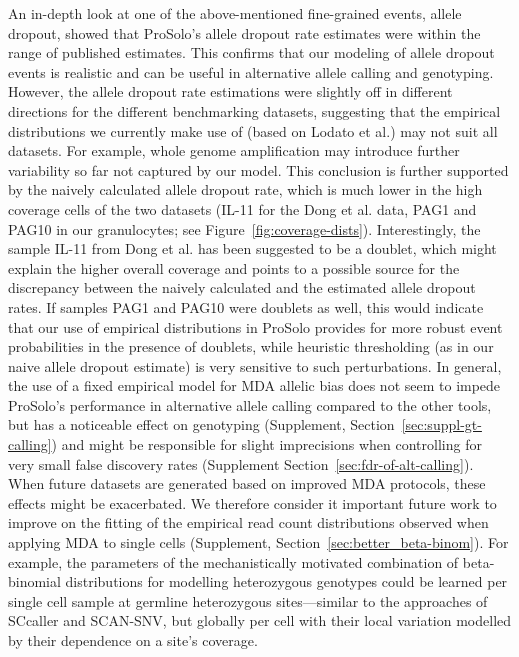 \documentclass[12pt,inline]{wlscirep}
\begin{document}
An in-depth look at one of the above-mentioned fine-grained events, allele dropout, showed that ProSolo's allele dropout rate estimates were within the range of published estimates.
This confirms that our modeling of allele dropout events is realistic and can be useful in alternative allele calling and genotyping.
However, the allele dropout rate estimations were slightly off in different directions for the different benchmarking datasets, suggesting that the empirical distributions we currently make use of (based on Lodato et al.\cite{lodato_somatic_2015}) may not suit all datasets.
For example, whole genome amplification may introduce further variability so far not captured by our model.  
This conclusion is further supported by the naively calculated allele dropout rate, which is much lower in the high coverage cells of the two datasets (IL-11 for the Dong et al. data\cite{dong_accurate_2017}, PAG1 and PAG10 in our granulocytes; see Figure~\ref{fig:coverage-dists}).
Interestingly, the sample IL-11 from Dong et al.\cite{dong_accurate_2017} has been suggested to be a doublet\cite{luquette_identification_2019}, which might explain the higher overall coverage and points to a possible source for the discrepancy between the naively calculated and the estimated allele dropout rates.
If samples PAG1 and PAG10 were doublets as well, this would indicate that our use of empirical distributions in ProSolo provides for more robust event probabilities in the presence of doublets, while heuristic thresholding (as in our naive allele dropout estimate) is very sensitive to such perturbations.
In general, the use of a fixed empirical model for MDA allelic bias does not seem to impede ProSolo's performance in alternative allele calling compared to the other tools, but has a noticeable effect on genotyping (Supplement, Section~\ref{sec:suppl-gt-calling}) and might be responsible for slight imprecisions when controlling for very small false discovery rates (Supplement Section~\ref{sec:fdr-of-alt-calling}).
When future datasets are generated based on improved MDA protocols\cite{lahnemann_eleven_2020}, these effects might be exacerbated.
We therefore consider it important future work to improve on the fitting of the empirical read count distributions observed when applying MDA to single cells (Supplement, Section~\ref{sec:better_beta-binom}).
For example, the parameters of the mechanistically motivated combination of beta-binomial distributions for modelling heterozygous genotypes could be learned per single cell sample at germline heterozygous sites---similar to the approaches of SCcaller and SCAN-SNV, but globally per cell with their local variation modelled by their dependence on a site's coverage.
\end{document}
